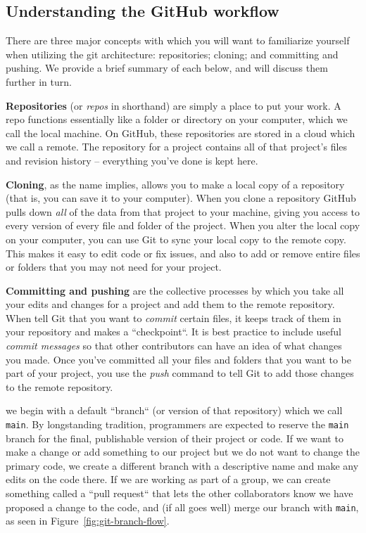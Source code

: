 \documentclass{tufte-book}
\begin{document}
\subsection{Understanding the GitHub workflow}\label{subsec:git-workflow} %

{There are three} major concepts with which you will want to familiarize yourself when utilizing the git architecture: repositories; cloning; and committing and pushing. We provide a brief summary of each below, and will discuss them further in turn.

\textbf{Repositories} (or \textit{repos} in shorthand) are simply a place to put your work. A repo functions essentially like a folder or directory on your computer, which we call the local machine. On GitHub, these repositories are stored in a cloud which we call a remote. The repository for a project contains all of that project's files and revision history -- everything you've done is kept here. 

\textbf{Cloning}, as the name implies, allows you to make a local copy of a repository (that is, you can save it to your computer). When you clone a repository GitHub pulls down \textit{all} of the data from that project to your machine, giving you access to every version of every file and folder of the project. When you alter the local copy on your computer, you can use Git to sync your local copy to the remote copy. This makes it easy to edit code or fix issues, and also to add or remove entire files or folders that you may not need for your project. %

\textbf{Committing and pushing} are the collective processes by which you take all your edits and changes for a project and add them to the remote repository. When tell Git that you want to \textit{commit} certain files, it keeps track of them in your repository and makes a ``checkpoint``. It is best practice to include useful \textit{commit messages} so that other contributors can have an idea of what changes you made. Once you've committed all your files and folders that you want to be part of your project, you use the \textit{push} command to tell Git to add those changes to the remote repository. 

 we begin with a default ``branch`` (or version of that repository) which we call \verb|main|. By longstanding tradition, programmers are expected to reserve the \verb|main| branch for the final, publishable version of their project or code. If we want to make a change or add something to our project but we do not want to change the primary code, we create a different branch with a descriptive name and make any edits on the code there. If we are working as part of a group, we can create something called a ``pull request`` that lets the other collaborators know we have proposed a change to the code, and (if all goes well) merge our branch with \verb|main|, as seen in Figure~\ref{fig:git-branch-flow}. 
\end{document}
